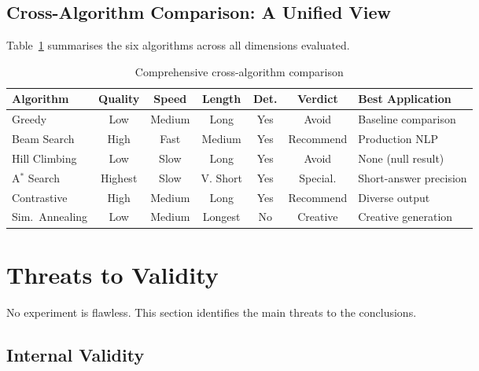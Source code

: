 \documentclass[12pt]{article}
\begin{document}
	\subsection{Cross-Algorithm Comparison: A Unified View}
	
	Table~\ref{tab:comparison_boxed} summarises the six algorithms across all dimensions evaluated.
	
\begin{table}[ht]
	\centering
	\caption{Comprehensive cross-algorithm comparison}
	\label{tab:comparison_boxed}
	\footnotesize
	\setlength{\tabcolsep}{3pt}
	\begin{tabularx}{\linewidth}{|X|c|c|c|c|c|X|}
		\hline
		\textbf{Algorithm} & \textbf{Quality} & \textbf{Speed} & \textbf{Length} & \textbf{Det.} & \textbf{Verdict} & \textbf{Best Application} \\ \hline
		Greedy          & Low    & Medium & Long    & Yes & Avoid    & Baseline comparison \\ \hline
		Beam Search     & High   & Fast   & Medium  & Yes & Recommend & Production NLP \\ \hline
		Hill Climbing   & Low    & Slow   & Long    & Yes & Avoid    & None (null result) \\ \hline
		A$^*$ Search    & Highest& Slow   & V. Short& Yes & Special.  & Short-answer precision \\ \hline
		Contrastive     & High   & Medium & Long    & Yes & Recommend & Diverse output \\ \hline
		Sim.\ Annealing & Low    & Medium & Longest & No  & Creative  & Creative generation \\ \hline
	\end{tabularx}
\end{table}
	
	\section{Threats to Validity}
	\label{sec:threats}
	
	No experiment is flawless. This section identifies the main threats to the conclusions.
	
	\subsection{Internal Validity}
	
\end{document}
